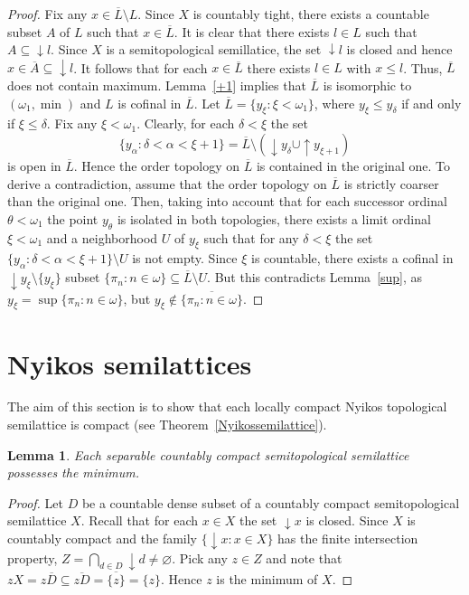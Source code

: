 \documentclass[12pt, twoside, leqno]{article}
\newtheorem{lemma}[theorem]{Lemma}
\theoremstyle{definition}
\numberwithin{equation}{section}
\newcommand{\w}{\omega}
\newcommand{\var}{\varnothing}
\begin{document}
\begin{proof}
Fix any $x\in\overline{L}\setminus L$. Since $X$ is countably tight, there exists a countable subset $A$ of $L$ such that $x\in \overline{L}$. It is clear that there exists $l\in L$ such that $A\subseteq {\downarrow}l$. Since $X$ is a semitopological semillatice, the set ${\downarrow}l$ is closed and hence $x\in \overline{A}\subseteq {\downarrow}l$. It follows that for each $x\in \overline{L}$ there exists $l\in L$ with $x\leq l$. Thus, $\overline{L}$ does not contain maximum. Lemma~\ref{+1} implies that $\overline{L}$ is isomorphic to $(\w_1,\min)$ and $L$ is cofinal in $\overline{L}$. 
Let $\overline{L}=\{y_\xi:\xi<\w_1\}$, where $y_\xi\leq y_{\delta}$ if and only if $\xi\leq \delta$. Fix any $\xi<\w_1$.  Clearly, for each $\delta<\xi$ the set $$\{y_\alpha: \delta< \alpha<{\xi+1}\}=\overline{L}\setminus ({\downarrow}y_\delta\cup {\uparrow}y_{\xi+1})$$ is open in $\overline{L}$. Hence the order topology on $\overline{L}$ is contained in the original one. To derive a contradiction, assume that the order topology on $\overline{L}$ is strictly coarser than the original one. Then, taking into account that for each successor ordinal $\theta<\w_1$ the point $y_\theta$ is isolated in both topologies, there exists a limit ordinal $\xi<\w_1$ and a neighborhood $U$ of $y_\xi$ such that for any $\delta<\xi$ the set $\{y_\alpha:\delta<\alpha<\xi+1\}\setminus U$ is not empty. Since $\xi$ is countable, there exists a cofinal in ${\downarrow}y_\xi\setminus \{y_\xi\}$ subset $\{\pi_n:n\in\w\}\subseteq\overline{L}\setminus U$. But this contradicts Lemma~\ref{sup}, as $y_\xi=\sup\{\pi_n:n\in\w\}$, but $y_\xi\notin\overline{\{\pi_n:n\in\w\}}$.
\end{proof}

\section{Nyikos semilattices}\label{NS}
The aim of this section is to show that each locally compact Nyikos topological semilattice is compact (see Theorem~\ref{Nyikossemilattice}).  


\begin{lemma}\label{0}
Each separable countably compact semitopological semilattice possesses the minimum.   
\end{lemma}

\begin{proof}
Let $D$ be a countable dense subset of a countably compact semitopological semilattice $X$. Recall that for each $x\in X$ the set ${\downarrow}x$ is closed. Since $X$ is countably compact and the family $\{{\downarrow}x:x\in X\}$ has the finite intersection property, $Z=\bigcap_{d\in D}{\downarrow}d\neq \var$. Pick any $z\in Z$ and note that $zX=z\overline{D}\subseteq \overline{zD}=\overline{ \{z\}}=\{z\}$. Hence $z$ is the minimum of $X$.   
\end{proof}
\end{document}

